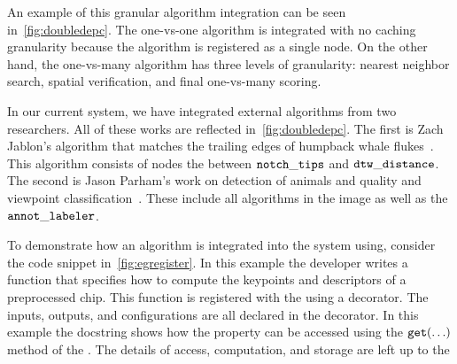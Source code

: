     An example of this granular algorithm integration can be seen
      in~\cref{fig:doubledepc}.
    The one-vs-one algorithm is integrated with no caching granularity because
      the algorithm is registered as a single node.
    On the other hand, the one-vs-many algorithm has three levels of
      granularity:
    nearest neighbor search, spatial verification, and final one-vs-many
      scoring.

    In our current system, we have integrated external algorithms from two
      researchers.
    All of these works are reflected in~\cref{fig:doubledepc}.
    The first is Zach Jablon's algorithm that matches the trailing edges of
      humpback whale flukes~\cite{jablons_identifying_2016}.
    This algorithm consists of nodes the between $\tt{notch\_tips}$ and
      $\tt{dtw\_distance}$.
    The second is Jason Parham's work on detection of animals and quality and
      viewpoint classification~\cite{parham_photographic_2015}.
    These include all algorithms in the image \depcache{} as well as the
      $\tt{annot\_labeler}$.

    \egregister{}

    To demonstrate how an algorithm is integrated into the system using,
      consider the code snippet in~\cref{fig:egregister}.
    In this example the developer writes a function that specifies how to
      compute the keypoints and descriptors of a preprocessed chip.
    This function is registered  with the \depcache{} using a decorator.
    The inputs, outputs, and configurations are all declared in the decorator.
    In this example the docstring shows how the property can be accessed using
      the $\tt{get(\ldots)}$ method of the \depcache{}.
    The details of access, computation, and storage are left up to the
      \depcache{}

    \renewcommand{\tablename}{table name}
    \newcommand{\colname}{column name}

